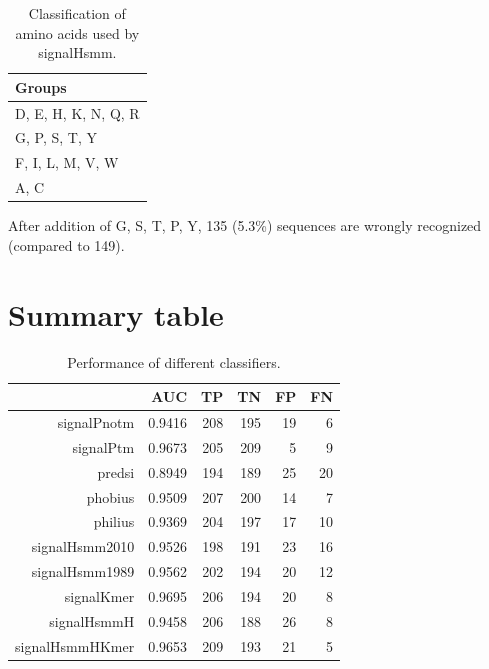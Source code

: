 \documentclass[10pt]{beamer}\usepackage[]{graphicx}\usepackage[]{color}
\begin{document}
\begin{frame}
\begin{table}[ht]
\centering
\begin{tabular}{l}
  \hline
Groups \\ 
  \hline
D, E, H, K, N, Q, R \\ 
  G, P, S, T, Y \\ 
  F, I, L, M, V, W \\ 
  A, C \\ 
   \hline
\end{tabular}
\caption{Classification of amino acids used by signalHsmm.} 
\end{table}

\end{frame}

\begin{frame}

After addition of G, S, T, P, Y, 135 (5.3\%) sequences are wrongly recognized (compared to 149).

\end{frame}

\section{Summary table}

\begin{frame}
\begin{table}[ht]
\centering
\caption{Performance of different classifiers.} 
\begin{tabular}{rrrrrr}
  \toprule
 & AUC & TP & TN & FP & FN \\ 
  \midrule
signalPnotm & 0.9416 &   208 &   195 &    19 &     6 \\ 
   \rowcolor[gray]{0.85}signalPtm & 0.9673 &   205 &   209 &     5 &     9 \\ 
  predsi & 0.8949 &   194 &   189 &    25 &    20 \\ 
   \rowcolor[gray]{0.85}phobius & 0.9509 &   207 &   200 &    14 &     7 \\ 
  philius & 0.9369 &   204 &   197 &    17 &    10 \\ 
   \rowcolor[gray]{0.85}signalHsmm2010 & 0.9526 &   198 &   191 &    23 &    16 \\ 
  signalHsmm1989 & 0.9562 &   202 &   194 &    20 &    12 \\ 
   \rowcolor[gray]{0.85}signalKmer & 0.9695 &   206 &   194 &    20 &     8 \\ 
  signalHsmmH & 0.9458 &   206 &   188 &    26 &     8 \\ 
   \rowcolor[gray]{0.85}signalHsmmHKmer & 0.9653 &   209 &   193 &    21 &     5 \\ 
   \bottomrule
\end{tabular}
\end{table}

\end{frame}
\end{document}
